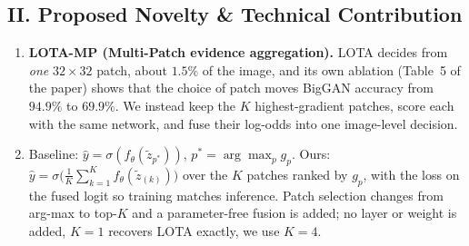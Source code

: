 \documentclass[8pt,a4paper]{article}
\begin{document}
\subsection*{II. Proposed Novelty \& Technical Contribution}
\begin{enumerate}
    \item \textbf{LOTA-MP (Multi-Patch evidence aggregation).} LOTA decides from \emph{one} $32{\times}32$ patch, about $1.5\%$ of the image, and its own ablation (Table~5 of the paper) shows that the choice of patch moves BigGAN accuracy from $94.9\%$ to $69.9\%$. We instead keep the $K$ highest-gradient patches, score each with the same network, and fuse their log-odds into one image-level decision.
    \item Baseline: $\hat y=\sigma(f_\theta(\tilde z_{p^*}))$, $p^*=\arg\max_p g_p$. Ours: $\hat y=\sigma\big(\tfrac1K\sum_{k=1}^{K} f_\theta(\tilde z_{(k)})\big)$ over the $K$ patches ranked by $g_p$, with the loss on the fused logit so training matches inference. Patch selection changes from arg-max to top-$K$ and a parameter-free fusion is added; no layer or weight is added, $K{=}1$ recovers LOTA exactly, we use $K{=}4$.
\end{enumerate}

\end{document}
